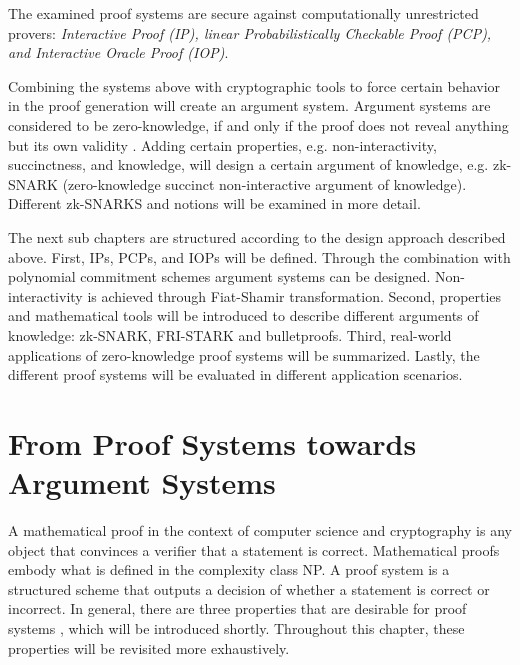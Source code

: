 The examined proof systems are secure against computationally unrestricted provers: \textit{Interactive Proof (IP), linear Probabilistically Checkable Proof (PCP), and Interactive Oracle Proof (IOP)}. 

Combining the systems above with cryptographic tools to force certain behavior in the proof generation will create an argument system. Argument systems are considered to be zero-knowledge, if and only if the proof does not reveal anything but its own validity \citep{GoldwasserIPs}. Adding certain properties, e.g. non-interactivity, succinctness, and knowledge, will design a certain argument of knowledge, e.g. zk-SNARK (zero-knowledge succinct non-interactive argument of knowledge). Different zk-SNARKS and notions will be examined in more detail.

The next sub chapters are structured according to the design approach described above. First, IPs, PCPs, and IOPs will be defined. Through the combination with polynomial commitment schemes argument systems can be designed. Non-interactivity is achieved through Fiat-Shamir transformation. Second, properties and mathematical tools will be introduced to describe different arguments of knowledge: zk-SNARK, FRI-STARK and bulletproofs. Third, real-world applications of zero-knowledge proof systems will be summarized. Lastly, the different proof systems will be evaluated in different application scenarios.

\section{From Proof Systems towards Argument Systems}

A mathematical proof in the context of computer science and cryptography is any object that convinces a verifier that a statement is correct. Mathematical proofs embody what is defined in the complexity class NP. A proof system is a structured scheme that outputs a decision of whether a statement is correct or incorrect. In general, there are three properties that are desirable for proof systems \citep{GoldwasserIPs}, which will be introduced shortly. Throughout this chapter, these properties will be revisited more exhaustively.

\begin{itemize}
\end{itemize}

